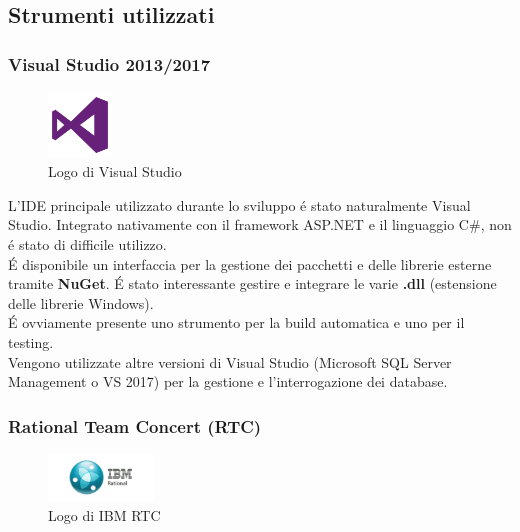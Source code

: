\subsection{Strumenti utilizzati}

\subsubsection{Visual Studio 2013/2017}
\begin{figure}
    \begin{center}
        \includegraphics[width=0.15\textwidth]{./res/img/visual-studio-2013-logo.png}
        \caption{Logo di Visual Studio}
    \end{center}
\end{figure}

L'IDE principale utilizzato durante lo sviluppo é stato naturalmente Visual Studio. Integrato nativamente con il framework ASP.NET e il linguaggio C\#, non é stato di difficile utilizzo. \\ É disponibile un interfaccia per la gestione dei pacchetti e delle librerie esterne tramite \textbf{NuGet}. É stato interessante gestire e integrare le varie \textbf{.dll} (estensione delle librerie Windows). \\ É ovviamente presente uno strumento per la build automatica e uno per il testing. \\
Vengono utilizzate altre versioni di Visual Studio (Microsoft SQL Server Management o VS 2017) per la gestione e l'interrogazione dei database.

\subsubsection{Rational Team Concert (RTC)}

\begin{figure}
    \begin{center}
        \includegraphics[width=0.25\textwidth]{./res/img/1-IBM-rational-1.png}
        \caption{Logo di IBM RTC}
    \end{center}
\end{figure}

